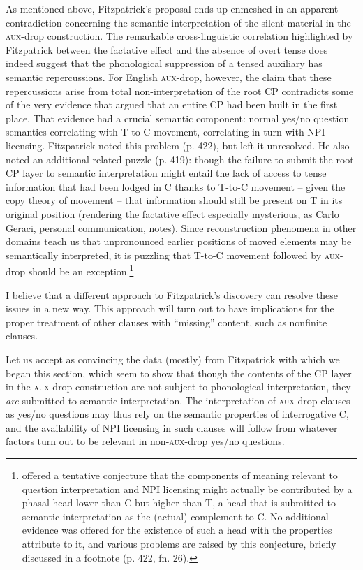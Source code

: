 \documentclass[output=paper]{langscibook}
\begin{document}
As mentioned above, Fitzpatrick's proposal ends up enmeshed in an apparent contradiction concerning the semantic interpretation of the silent material in the \textsc{aux-}drop construction. The remarkable cross-linguistic correlation highlighted by Fitzpatrick between the factative effect and the absence of overt tense does indeed suggest that the phonological suppression of a tensed auxiliary has semantic repercussions. For English \textsc{aux}-drop, however, the claim that these repercussions arise from total non-interpretation of the root CP contradicts some of the very evidence that argued that an entire CP had been built in the first place. That evidence had a crucial semantic component: normal yes/no question semantics correlating with T-to-C movement, correlating in turn with NPI licensing. Fitzpatrick noted this problem (p. 422), but left it unresolved. He also noted an additional related puzzle (p. 419): though the failure to submit the root CP layer to semantic interpretation might entail the lack of access to tense information that had been lodged in C thanks to T-to-C movement -- given the copy theory of movement -- that information should still be present on T in its original position (rendering the factative effect especially mysterious, as Carlo Geraci, personal communication, notes). Since reconstruction phenomena in other domains teach us that unpronounced earlier positions of moved elements may be semantically interpreted, it is puzzling that T-to-C movement followed by \textsc{aux-}drop should be an exception.\footnote{\citet{fitzpatrick2006deletion} offered a tentative conjecture that the components of meaning relevant to question interpretation and NPI licensing might actually be contributed by a phasal head lower than C but higher than T, a head that is submitted to semantic interpretation as the (actual) complement to C. No additional evidence was offered for the existence of such a head with the properties attribute to it, and various problems are raised by this conjecture, briefly discussed in a footnote (p. 422, fn. 26).}

\begin{sloppypar}
I believe that a different approach to Fitzpatrick's discovery can resolve these issues in a new way. This approach will turn out to have implications for the proper treatment of other clauses with “missing” content, such as nonfinite clauses.
\end{sloppypar}

Let us accept as convincing the data (mostly) from Fitzpatrick with which we began this section, which seem to show that though the contents of the CP layer in the \textsc{aux}-drop construction are not subject to phonological interpretation, they \textit{are} submitted to semantic interpretation. The interpretation of \textsc{aux}-drop clauses as yes/no questions may thus rely on the semantic properties of interrogative C, and the availability of NPI licensing in such clauses will follow from whatever factors turn out to be relevant in non-\textsc{aux-}drop yes/no questions.
\end{document}
